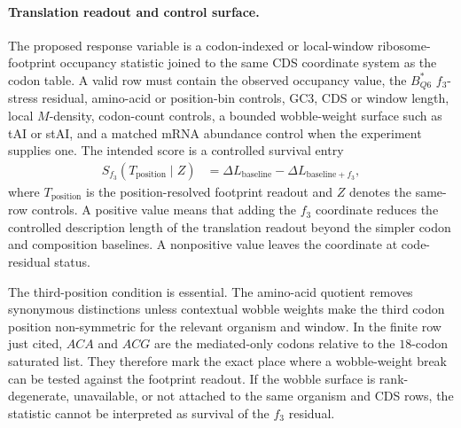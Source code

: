\paragraph{Translation readout and control surface.}
The proposed response variable is a codon-indexed or local-window ribosome-footprint occupancy statistic joined to the same CDS coordinate system as the codon table.  A valid row must contain the observed occupancy value, the $B^{*}_{Q6}$ $f_3$-stress residual, amino-acid or position-bin controls, GC3, CDS or window length, local $M$-density, codon-count controls, a bounded wobble-weight surface such as tAI or stAI, and a matched mRNA abundance control when the experiment supplies one.  The intended score is a controlled survival entry
$$
\begin{aligned}
S_{f_3}(T_{\mathrm{position}}\mid Z)
  &= \Delta L_{\mathrm{baseline}}-\Delta L_{\mathrm{baseline}+f_3},
\end{aligned}
$$
where $T_{\mathrm{position}}$ is the position-resolved footprint readout and $Z$ denotes the same-row controls.  A positive value means that adding the $f_3$ coordinate reduces the controlled description length of the translation readout beyond the simpler codon and composition baselines.  A nonpositive value leaves the coordinate at code-residual status.

The third-position condition is essential.  The amino-acid quotient removes synonymous distinctions unless contextual wobble weights make the third codon position non-symmetric for the relevant organism and window.  In the finite row just cited, $ACA$ and $ACG$ are the mediated-only codons relative to the $18$-codon saturated list.  They therefore mark the exact place where a wobble-weight break can be tested against the footprint readout.  If the wobble surface is rank-degenerate, unavailable, or not attached to the same organism and CDS rows, the statistic cannot be interpreted as survival of the $f_3$ residual.

